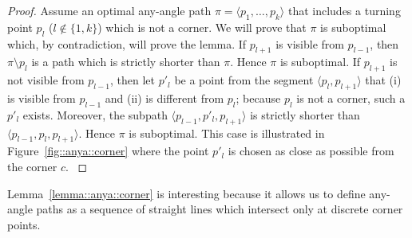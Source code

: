 \begin{proof}
{
  Assume an optimal any-angle path $\pi = \langle p_1,\dots,p_k \rangle$ 
  that includes a turning point $p_l$ ($l \not\in \{1,k\}$) 
  which is not a corner.  
  We will prove that $\pi$ is suboptimal 
  which, by contradiction, will prove the lemma.  
  If $p_{l+1}$ is visible from $p_{l-1}$, 
  then  $\pi \setminus p_l$ is a path 
  which is strictly shorter than $\pi$.  
  Hence $\pi$ is suboptimal.  
  If $p_{l+1}$ is not visible from $p_{l-1}$, 
  then let $p'_{l}$ be a point from the segment $\langle p_l,p_{l+1} \rangle$ 
  that (i) is visible from $p_{l-1}$ 
  and (ii) is different from $p_l$; 
  because $p_l$ is not a corner, 
  such a $p'_l$ exists.  
  Moreover, the subpath $\langle p_{l-1}, p'_{l}, p_{l+1} \rangle$ is 
  strictly shorter than $\langle p_{l-1}, p_{l}, p_{l+1}\rangle$. 
  Hence $\pi$ is suboptimal.
  This case is illustrated in Figure~\ref{fig::anya::corner}  
  where the point $p'_l$ is chosen as close as possible from the corner $c$.  
}
\end{proof}
Lemma~\ref{lemma::anya::corner} is interesting because it allows us to define 
any-angle paths as a sequence of straight lines which intersect only at
discrete corner points.
